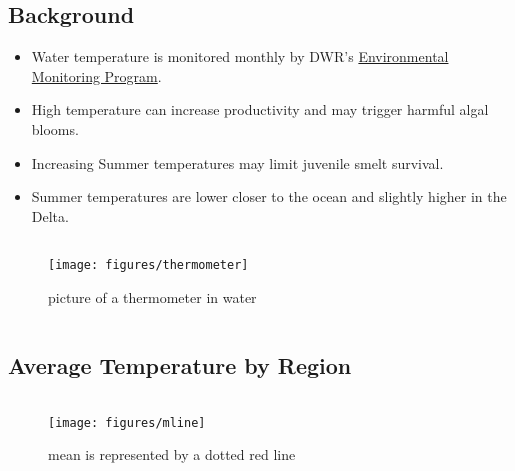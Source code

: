 \documentclass[
]{book}
\providecommand{\tightlist}{%
  \setlength{\itemsep}{0pt}\setlength{\parskip}{0pt}}
\begin{document}
\begin{columns-nocenter}

\begin{column}

\hypertarget{background-1}{%
\subsection{Background}\label{background-1}}

\begin{itemize}
\tightlist
\item
  Water temperature is monitored monthly by DWR's \href{https://emp.baydeltalive.com/wiki/12297}{Environmental Monitoring Program}.
\item
  High temperature can increase productivity and may trigger harmful algal blooms.
\item
  Increasing Summer temperatures may limit juvenile smelt survival.
\item
  Summer temperatures are lower closer to the ocean and slightly higher in the Delta.
\end{itemize}

\end{column}

\begin{column}

\begin{figure}

{\centering \texttt{[image: figures/thermometer]} 

}

\caption{picture of a thermometer in water}\label{fig:unnamed-chunk-55}
\end{figure}

\end{column}

\end{columns-nocenter}

\hypertarget{average-temperature-by-region}{%
\subsection{Average Temperature by Region}\label{average-temperature-by-region}}

\begin{columns-nocenter}

\begin{column}

\begin{figure}
\texttt{[image: figures/mline]} \caption{mean is represented by a dotted red line}\label{fig:unnamed-chunk-56}
\end{figure}

\end{column}

\begin{column}

\end{column}

\begin{column}

\end{column}

\end{columns-nocenter}
\end{document}
